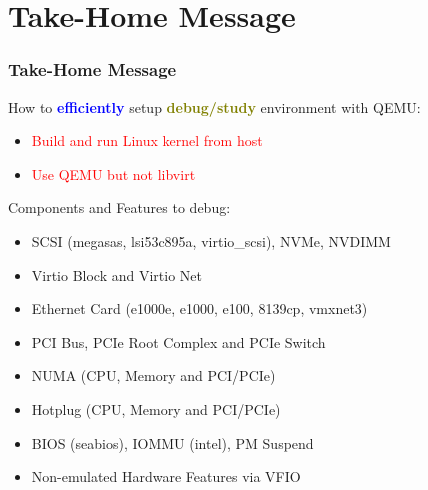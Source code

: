\documentclass[aspectratio=169]{beamer}
\begin{document}

\section{Take-Home Message}
\begin{frame}
\frametitle{Take-Home Message}
{\Large How to \textbf{\textcolor{blue}{efficiently}} setup \textbf{\textcolor{olive}{debug/study}} environment with QEMU:}
\begin{itemize}
\item {\Large \textcolor{red}{Build and run Linux kernel from host}}
\item {\Large \textcolor{red}{Use QEMU but not libvirt}}
\end{itemize}

\vspace{4 mm}

{\Large Components and Features to debug:}
\begin{itemize}
\item SCSI (megasas, lsi53c895a, virtio\_scsi), NVMe, NVDIMM
\item Virtio Block and Virtio Net
\item Ethernet Card (e1000e, e1000, e100, 8139cp, vmxnet3)
\item PCI Bus, PCIe Root Complex and PCIe Switch
\item NUMA (CPU, Memory and PCI/PCIe)
\item Hotplug (CPU, Memory and PCI/PCIe)
\item BIOS (seabios), IOMMU (intel), PM Suspend
\item Non-emulated Hardware Features via VFIO
\end{itemize}
\end{frame}

\end{document}
